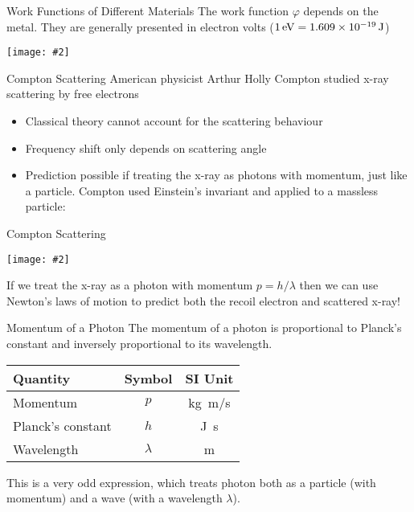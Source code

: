 \documentclass[12pt,compress,aspectratio=169]{beamer}
\newcommand{\pic}[2]{\texttt{[image: \#2]}}
\newcommand{\eq}[2]{\vspace{#1}{\Large\begin{displaymath}#2\end{displaymath}}}
\begin{document}
\begin{frame}{Work Functions of Different Materials}
  The work function $\varphi$ depends on the metal. They are generally presented
  in electron volts ($\SI1{\electronvolt}=\SI{1.609e-19}{\joule}$)
  \begin{center}
    \pic{.35}{work-function}
  \end{center}
\end{frame}


\begin{frame}{Compton Scattering}
  American physicist Arthur Holly Compton studied x-ray scattering by free
  electrons
  \begin{itemize}
  \item Classical theory cannot account for the scattering behaviour
  \item Frequency shift only depends on scattering angle
  \item Prediction possible if treating the x-ray as photons with
    momentum, just like a particle. Compton used Einstein's invariant and
    applied to a massless particle:
  \end{itemize}

  \eq{-.3in}{
    \boxed{p=\frac{E}{c}=\frac{hf}{c}=\frac{h}{\lambda}}
  }
\end{frame}

\begin{frame}{Compton Scattering}
  \begin{center}
    \pic{.5}{compton2}
  \end{center}
  If we treat the x-ray as a photon with momentum $p=h/\lambda$ then we can
  use Newton's laws of motion to predict both the recoil electron and scattered
  x-ray!
\end{frame}



\begin{frame}{Momentum of a Photon}
  The momentum of a photon is proportional to Planck's constant and 
  inversely proportional to its wavelength.

  \eq{-.2in}{
    \boxed{p=\frac{h}{\lambda}}
  }
  \begin{center}
    \begin{tabular}{l|c|c}
      \rowcolor{pink}
      \textbf{Quantity} & \textbf{Symbol} & \textbf{SI Unit} \\ \hline
      Momentum          & $p$ & \si{\kilo\gram.\metre/\second}\\
      Planck's constant & $h$ & \si{\joule.\second}\\
      Wavelength        & $\lambda$ & \si{\metre}
    \end{tabular}
  \end{center}
  This is a very odd expression, which treats photon both as a particle (with
  momentum) and a wave (with a wavelength $\lambda$).
\end{frame}
\end{document}
